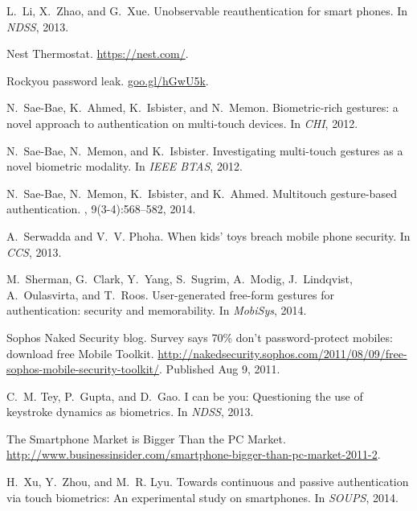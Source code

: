 \documentclass{sig-alternate-05-2015}
\begin{document}
{\begin{thebibliography}{10}
L.~Li, X.~Zhao, and G.~Xue.
\newblock Unobservable reauthentication for smart phones.
\newblock In {\em NDSS}, 2013.

{Nest Thermostat}.
\newblock \url{https://nest.com/}.

{Rockyou password leak}.
\newblock \url{goo.gl/hGwU5k}.

N.~Sae-Bae, K.~Ahmed, K.~Isbister, and N.~Memon.
\newblock Biometric-rich gestures: a novel approach to authentication on
  multi-touch devices.
\newblock In {\em CHI}, 2012.

N.~Sae-Bae, N.~Memon, and K.~Isbister.
\newblock Investigating multi-touch gestures as a novel biometric modality.
\newblock In {\em IEEE BTAS}, 2012.

N.~Sae-Bae, N.~Memon, K.~Isbister, and K.~Ahmed.
\newblock Multitouch gesture-based authentication.
,
  9(3-4):568--582, 2014.

A.~Serwadda and V.~V. Phoha.
\newblock When kids' toys breach mobile phone security.
\newblock In {\em CCS}, 2013.

M.~Sherman, G.~Clark, Y.~Yang, S.~Sugrim, A.~Modig, J.~Lindqvist,
  A.~Oulasvirta, and T.~Roos.
\newblock User-generated free-form gestures for authentication: security and
  memorability.
\newblock In {\em MobiSys}, 2014.

{Sophos Naked Security blog}.
\newblock Survey says 70\% don't password-protect mobiles: download free
  {M}obile {T}oolkit.
\newblock
  \url{http://nakedsecurity.sophos.com/2011/08/09/free-sophos-mobile-security-toolkit/}.
\newblock Published Aug 9, 2011.

C.~M. Tey, P.~Gupta, and D.~Gao.
\newblock I can be you: Questioning the use of keystroke dynamics as
  biometrics.
\newblock In {\em NDSS}, 2013.

{The Smartphone Market is Bigger Than the PC Market}.
\newblock
  \url{http://www.businessinsider.com/smartphone-bigger-than-pc-market-2011-2}.

H.~Xu, Y.~Zhou, and M.~R. Lyu.
\newblock Towards continuous and passive authentication via touch biometrics:
  An experimental study on smartphones.
\newblock In {\em SOUPS}, 2014.

\end{thebibliography}

}
\end{document}
